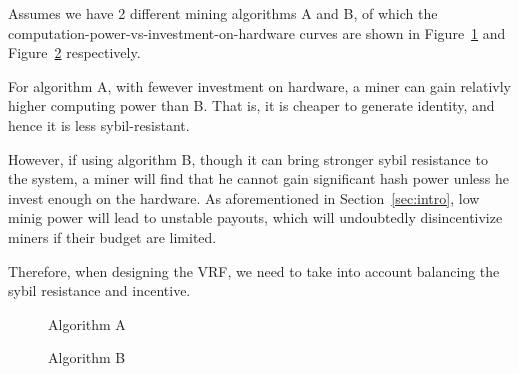 
Assumes we have 2 different mining algorithms A and B, of which the computation-power-vs-investment-on-hardware curves are shown in Figure~\ref{fig:algo_A} and Figure~\ref{fig:algo_B} respectively.

For algorithm A, with fewever investment on hardware, a miner can gain relativly higher computing power than B. That is, it is cheaper to generate identity, and hence it is less sybil-resistant.

However, if using algorithm B, though it can bring stronger sybil resistance to the system, a miner will find that he cannot gain significant hash power unless he invest enough on the hardware.
As aforementioned in Section~\ref{sec:intro}, low minig power will lead to unstable payouts, which will undoubtedly disincentivize miners if their budget are limited.

Therefore, when designing the VRF, we need to take into account balancing the sybil resistance and incentive.

\begin{figure}
\centering
{}
\caption{Algorithm A}
\label{fig:algo_A}
\end{figure}


\begin{figure}
\centering
{}
\caption{Algorithm B}
\label{fig:algo_B}
\end{figure}
